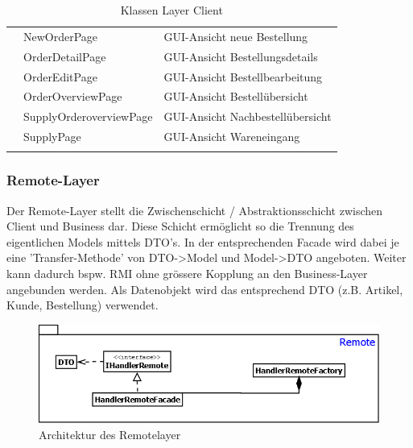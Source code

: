 \begin{longtable} {|l|ll|}
		& NewOrderPage                                                              & GUI-Ansicht neue Bestellung                                                                                                                     \\ \cline{2-3} 
		& OrderDetailPage                                                           & GUI-Ansicht Bestellungsdetails                                                                                                                  \\ \cline{2-3} 
		& OrderEditPage                                                             & GUI-Ansicht Bestellbearbeitung                                                                                                                  \\ \cline{2-3} 
		& OrderOverviewPage                                                         & GUI-Ansicht Bestellübersicht                                                                                                                    \\ \cline{2-3} 
		& SupplyOrderoverviewPage                                                   & GUI-Ansicht Nachbestellübersicht                                                                                                                \\ \cline{2-3} 
		& SupplyPage                                                                & GUI-Ansicht Wareneingang                                                                                                                        \\ \hline
	\caption{Klassen Layer Client}
	\label{tab:classes-layer-client}
\end{longtable}
\clearpage

\subsubsection{Remote-Layer}
Der Remote-Layer stellt die Zwischenschicht / Abstraktionsschicht zwischen Client und Business dar. Diese Schicht ermöglicht so die Trennung des eigentlichen Models mittels DTO's. In der entsprechenden Facade wird dabei je eine 'Transfer-Methode' von DTO->Model und Model->DTO angeboten. Weiter kann dadurch bspw. RMI ohne grössere Kopplung an den Business-Layer angebunden werden.
Als Datenobjekt wird das entsprechend DTO (z.B. Artikel, Kunde, Bestellung) verwendet.  
\begin{figure}[H]
	\includegraphics[width=1.0\linewidth]{Images/RemoteLayer-Architektur}
	\caption{Architektur des Remotelayer}
	\label{fig:remotelayer-architektur}
\end{figure}

